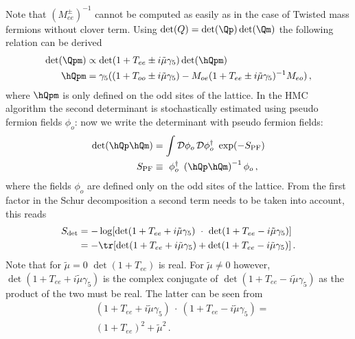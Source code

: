 Note that $(M_{ee}^\pm)^{-1}$ cannot be computed as easily as in the
case of Twisted mass fermions without clover term.
Using $\det(Q)=\det(\Qp)\det(\Qm)$ the following relation can be derived
\begin{equation}
  \label{eq:eosw4}
  \begin{split}
    \det(\Qpm) &\propto \det(1+T_{ee} \pm i\tilde\mu\gamma_5)\det(\hQpm) \\
    \hQpm &= \gamma_5((1 + T_{oo} \pm i\tilde\mu\gamma_5) -
             M_{oe}( 1 + T_{ee} \pm i\tilde\mu\gamma_5 )^{-1}M_{eo})\, ,
  \end{split}
\end{equation}
where $\hQpm$ is only defined on the odd sites of the lattice. In the
HMC algorithm the second determinant is stochastically estimated using
pseudo fermion fields $\phi_o$: now we write the determinant with
pseudo fermion fields:
\begin{equation}
  \begin{split}
    \det(\hQp \hQm) &= \int \mathcal{D}\phi_o\,\mathcal{D}\phi^\dagger_o\
    \exp(-S_\mathrm{PF})\\
    S_\mathrm{PF} &\equiv\ \phi_o^\dagger\ \left(\hQp\hQm\right)^{-1}\phi_o\, ,
  \end{split}
\end{equation}
where the fields $\phi_o$ are defined only on the odd sites of the
lattice. From the first factor in the Schur decomposition a second
term needs to be taken into account, this reads
\begin{equation}
  \label{eq:swdet}
  \begin{split}
    S_{\det} &=  - \log[\det(1+T_{ee} + i\tilde\mu\gamma_5)\ \cdot\ 
    \det(1+T_{ee} - i\tilde\mu\gamma_5)]\\
    &= -\tr[\det(1+T_{ee} + i\tilde\mu\gamma_5) + \det(1+T_{ee} -
    i\tilde\mu\gamma_5)]\, .\\
  \end{split}
\end{equation}
Note that for $\tilde\mu=0$  $\det(1+T_{ee})$ is real. For
$\tilde\mu\neq0$ however, $\det(1+T_{ee}+i\tilde\mu\gamma_5)$ is the
complex conjugate of $\det(1+T_{ee}-i\tilde\mu\gamma_5)$ as the
product of the two must be real. The latter can be seen from
\[
\begin{split}
  &(1+T_{ee} + i\tilde\mu\gamma_5)\ \cdot\ (1+T_{ee} -
  i\tilde\mu\gamma_5) = \\
  &(1+T_{ee})^2 + \tilde\mu^2\, .\\
\end{split}
\]
